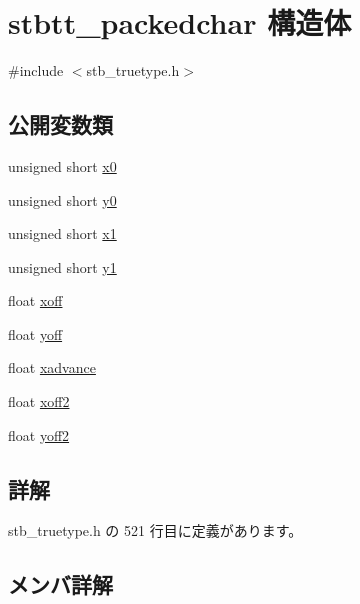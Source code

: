 \hypertarget{structstbtt__packedchar}{}\section{stbtt\+\_\+packedchar 構造体}
\label{structstbtt__packedchar}


{\ttfamily \#include $<$stb\+\_\+truetype.\+h$>$}

\subsection*{公開変数類}
\begin{DoxyCompactItemize}
\item 
unsigned short \mbox{\hyperlink{structstbtt__packedchar_a02cb73a5af37ed60dafd5e4b731af09e}{x0}}
\item 
unsigned short \mbox{\hyperlink{structstbtt__packedchar_a43429c9545ca8ccf14012cedcf83c1a7}{y0}}
\item 
unsigned short \mbox{\hyperlink{structstbtt__packedchar_a99d371f0261cd13dfd1a179f143175d1}{x1}}
\item 
unsigned short \mbox{\hyperlink{structstbtt__packedchar_a9569073ba79fad355210b6ffc35905a7}{y1}}
\item 
float \mbox{\hyperlink{structstbtt__packedchar_adb30c50674c79d32116ae6f94bd5893f}{xoff}}
\item 
float \mbox{\hyperlink{structstbtt__packedchar_a6f342ae10df5319f4999ffd256567142}{yoff}}
\item 
float \mbox{\hyperlink{structstbtt__packedchar_a28707ae98d1fa946b3390840aeff76ab}{xadvance}}
\item 
float \mbox{\hyperlink{structstbtt__packedchar_a3a33880f925ca826c908cbf9f0673c9f}{xoff2}}
\item 
float \mbox{\hyperlink{structstbtt__packedchar_a2ec5bbd1010c9a9b7cbdeb7503dcaffa}{yoff2}}
\end{DoxyCompactItemize}


\subsection{詳解}


 stb\+\_\+truetype.\+h の 521 行目に定義があります。



\subsection{メンバ詳解}
\mbox{\label{structstbtt__packedchar_a02cb73a5af37ed60dafd5e4b731af09e}} 
